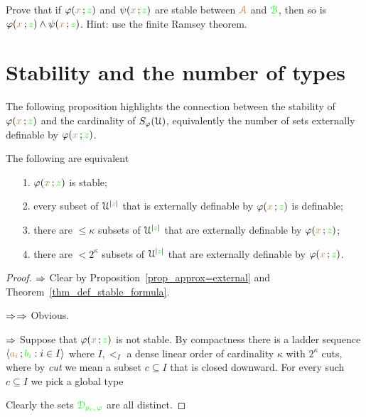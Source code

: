 \documentclass[creche.tex]{subfiles}
\begin{document}
  \begin{exercise}\label{ex_stability_conjunction}
    Prove that if $\varphi({\color{brown} x}\,;{\color{green} z})$ and $\psi({\color{brown} x}\,;{\color{green} z})$ are stable between ${\color{brown}\EuScript A}$ and ${\color{green}\EuScript B}$, then so is $\varphi({\color{brown} x}\,;{\color{green} z})\wedge\psi({\color{brown} x}\,;{\color{green} z})$.
    Hint: use the finite Ramsey theorem.\QED
  \end{exercise}

\section{Stability and the number of types}


The following proposition highlights the connection between the stability of $\varphi({\color{brown} x}\,;{\color{green} z})$ and the cardinality of $S_\varphi(\EuScript U)$, equivalently the number of sets externally definable by $\varphi({\color{brown} x}\,;{\color{green} z})$. 

\begin{theorem}\label{thm_def_stable_formula2}
   The following are equivalent
   \begin{itemize}
     \item[1.] $\varphi({\color{brown} x}\,;{\color{green} z})$ is stable;
     \item[2.] every subset of $\EuScript U^{|{\color{green} z}|}$ that is externally definable by $\varphi({\color{brown} x}\,;{\color{green} z})$ is definable;
     \item[3.] there are $\le\kappa$ subsets of $\EuScript U^{|{\color{green} z}|}$ that are externally definable by $\varphi({\color{brown} x}\,;{\color{green} z})$;
     \item[4.] there are $<2^\kappa$ subsets of $\EuScript U^{|{\color{green} z}|}$ that are externally definable by $\varphi({\color{brown} x}\,;{\color{green} z})$.
   \end{itemize}
 \end{theorem}
 
 \begin{proof}
 $\Rightarrow$ Clear by Proposition~\ref{prop_approx=external} and Theorem~\ref{thm_def_stable_formula}.
 
 $\Rightarrow$$\Rightarrow$ Obvious.
 
 $\Rightarrow$ Suppose that $\varphi({\color{brown} x}\,;{\color{green} z})$ is not stable.
 By compactness there is a ladder sequence  $\langle{\color{brown}a_i}\,;{\color{green} b_i} : i\in I\rangle$ where $I,<_I$ a dense linear order of cardinality $\kappa$ with $2^\kappa$ cuts, where by \textit{cut\/} we mean a subset $c\subseteq I$ that is closed downward.
 For every such $c\subseteq I$ we pick a global type
 
 
 Clearly the sets ${\color{green}\EuScript D_{p_c,\,\varphi} }$ are all distinct.
 \end{proof}
\end{document}
